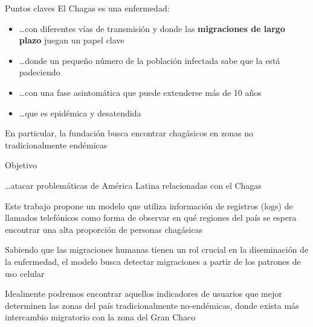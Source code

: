 \documentclass[xcolor=x11names]{beamer}
\begin{document}
\begin{frame}{Puntos claves}
	El Chagas es una enfermedad:
	\begin{itemize}
		\item \ldots con diferentes vías de transmisión y donde las \textbf{migraciones de largo plazo} juegan un papel clave
		\item \ldots donde un pequeño número de la población infectada sabe que la está padeciendo
		\item \ldots con una fase asintomática que puede extenderse más de 10 años
		\item \ldots que es epidémica y desatendida
	\end{itemize}
	En particular, la fundación busca encontrar chagásicos en zonas no tradicionalmente endémicas
\end{frame}


\begin{frame}{Objetivo}
	\begin{block}{\ldots atacar problemáticas de América Latina relacionadas con el Chagas}

	Este trabajo propone un modelo que utiliza información de registros (logs) de llamados telefónicos
	como forma de observar en qué regiones del país se espera encontrar una alta proporción de personas chagásicas

	\bigskip
	Sabiendo que las migraciones humanas tienen un rol crucial en la diseminación de la enfermedad, el modelo busca
	detectar migraciones a partir de los patrones de uso celular

	\bigskip
	Idealmente podremos encontrar aquellos indicadores de usuarios que mejor determinen las zonas del país tradicionalmente no-endémicas, donde exista más intercambio migratorio con la zona del Gran Chaco
	\end{block}
\end{frame}
\end{document}

